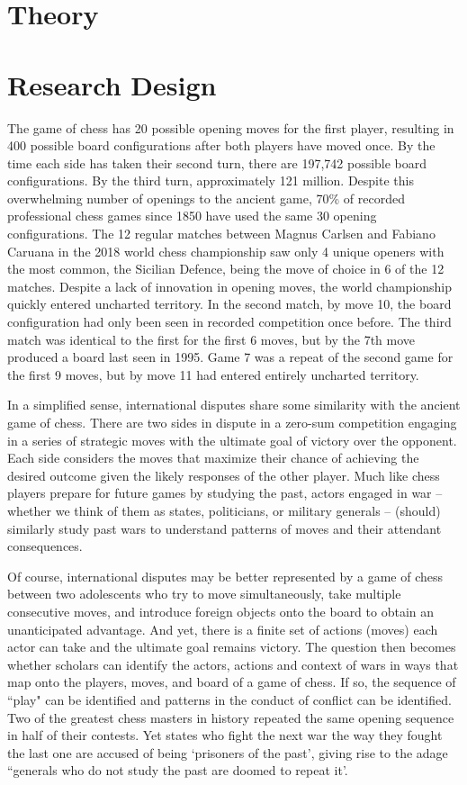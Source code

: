 \documentclass[12pt,letterpaper]{article}
\begin{document}
\section{Theory}


\section{Research Design}
	The game of chess has 20 possible opening moves for the first player, resulting in 400 possible board configurations after both players have moved once. By the time each side has taken their second turn, there are 197,742 possible board configurations. By the third turn, approximately 121 million. Despite this overwhelming number of openings to the ancient game, 70\% of recorded professional chess games since 1850 have used the same 30 opening configurations. The 12 regular matches between Magnus Carlsen and Fabiano Caruana in the 2018 world chess championship saw only 4 unique openers with the most common, the Sicilian Defence, being the move of choice in 6 of the 12 matches. Despite a lack of innovation in opening moves, the world championship quickly entered uncharted territory. In the second match, by move 10, the board configuration had only been seen in recorded competition once before. The third match was identical to the first for the first 6 moves, but by the 7th move produced a board last seen in 1995. Game 7 was a repeat of the second game for the first 9 moves, but by move 11 had entered entirely uncharted territory.
	
	In a simplified sense, international disputes share some similarity with the ancient game of chess. There are two sides in dispute in a zero-sum competition engaging in a series of strategic moves with the ultimate goal of victory over the opponent. Each side considers the moves that maximize their chance of achieving the desired outcome given the likely responses of the other player. Much like chess players prepare for future games by studying the past, actors engaged in war -- whether we think of them as states, politicians, or military generals -- (should) similarly study past wars to understand patterns of moves and their attendant consequences.
	
	Of course, international disputes may be better represented by a game of chess between two adolescents who try to move simultaneously, take multiple consecutive moves, and introduce foreign objects onto the board to obtain an unanticipated advantage. And yet, there is a finite set of actions (moves) each actor can take and the ultimate goal remains victory. The question then becomes whether scholars can identify the actors, actions and context of wars in ways that map onto the players, moves, and board of a game of chess. If so, the sequence of ``play" can be identified and patterns in the conduct of conflict can be identified. Two of the greatest chess masters in history repeated the same opening sequence in half of their contests. Yet states who fight the next war the way they fought the last one are accused of being `prisoners of the past', giving rise to the adage ``generals who do not study the past are doomed to repeat it'.
\end{document}
